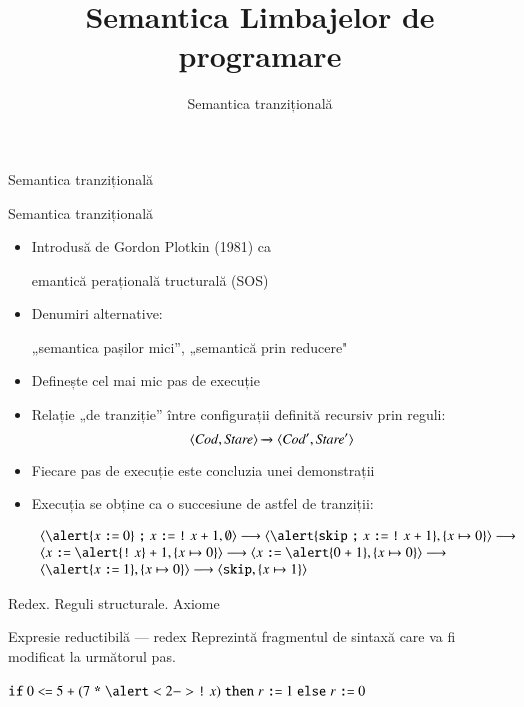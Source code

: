 \documentclass[handout,xcolor=pdftex,romanian,colorlinks]{beamer}
\title[SLP---SOS]{Semantica Limbajelor de programare}
\subtitle{Semantica tranzițională}
\begin{document}
\maketitle

\begin{section}{Semantica tranzițională}
\begin{frame}{Semantica tranzițională}{}
\begin{itemize}
\item Introdusă de Gordon Plotkin (1981) ca 

\hfill  {}emantică perațională tructurală (SOS) \hfill \;
\item Denumiri alternative: 

\hfill „semantica pașilor mici”, „semantică prin reducere"\hfill \;
\item Definește cel mai mic pas de execuție 
\item Relație „de tranziție” între configurații definită recursiv prin reguli:
$$\displaystyle{\ensuremath {{\langle{{\it Cod}, {\it Stare}}\rangle}} \xrightarrow{} {{\ensuremath \langle{{\it Cod'}, {\it Stare'}}\rangle}}}$$
\item Fiecare pas de execuție este concluzia unei demonstrații
\item Execuția se obține ca o succesiune de astfel de tranziții:

$\begin{array}{l}
\c{\alert{x \terminal{:=} 0} \terminal{;}  x \terminal{:=} {\terminal{!} x} \terminal{+} 1,\emptyset}
\longrightarrow
\c{\alert{{\terminal{skip}} \terminal{;}  x \terminal{:=} {\terminal{!} x} \terminal{+} 1},\{x \mapsto 0\}}
\longrightarrow
\\
\c{x \terminal{:=} \alert{\terminal{!} x} \terminal{+} 1,\{x \mapsto 0\}}
\longrightarrow
\c{x \terminal{:=} \alert{0 \terminal{+} 1},\{x \mapsto 0\}}
\longrightarrow
\\
\c{\alert{x \terminal{:=} 1},\{x \mapsto 0\}}
\longrightarrow
\c{\terminal{skip},\{x \mapsto 1\}}
\end{array}$
\end{itemize}
\end{frame}

\begin{frame}{Redex. Reguli structurale. Axiome}
\begin{block}{\alert{Ex}presie \alert{red}uctibilă --- \alert{redex}}
Reprezintă fragmentul de sintaxă care va fi modificat la următorul pas.

\hfill$\Sif 0 \terminal{<=} 5 \terminal{+} (7 \terminal{*} \alert<2->{\terminal{!} x}) \Sthen  r \terminal{:=}1 \Selse r \terminal{:=}0 $\hfill\ 
\end{block}


\end{frame}
\end{section}
\end{document}
